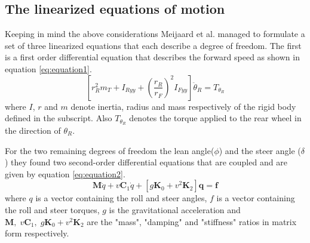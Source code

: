 \subsection{The linearized equations of motion} \label{subsec:EOM}
Keeping in mind the above considerations Meijaard et al.\cite{meijaard2007linearized} managed to formulate a set of three linearized equations that each describe a degree of freedom. The first is a first order differential equation that describes the forward speed as shown in equation \ref{eq:equation1}\cite{meijaard2007linearized}.
\begin{equation}
    \left[r_{R}^{2} m_{T}+I_{R y y}+\left(\frac{r_{R}}{r_{F}}\right)^{2} I_{F y y}\right] \ddot{\theta}_{R}=T_{\theta_{R}}
    \label{eq:equation1}
\end{equation}
where \ensuremath{I}, \ensuremath{r} and \ensuremath{m} denote inertia, radius and mass respectively of the rigid body defined in the subscript. Also \ensuremath{T_{\theta_{R}}} denotes the torque applied to the rear wheel in the direction of \ensuremath{\theta_{R}}.
\par
For the two remaining degrees of freedom the lean angle(\ensuremath{\phi}) and the steer angle (\ensuremath{\delta}) they found two second-order differential equations that are coupled and are given by equation \ref{eq:equation2}\cite{meijaard2007linearized}.
\begin{equation}
    \mathbf{M} \ddot{q}+v \mathbf{C}_{1} \dot{q}+\left[g \mathbf{K}_{0}+v^{2} \mathbf{K}_{2}\right] \mathbf{q}=\mathbf{f}
    \label{eq:equation2}
\end{equation}
where \ensuremath{q} is a vector containing the roll and steer angles, \ensuremath{f} is a vector containing the roll and steer torques, \ensuremath{g} is the gravitational acceleration and \ensuremath{\mathbf{M},\;v\mathbf{C}_{1},\;g \mathbf{K}_{0}+v^{2} \mathbf{K}_{2}} are the "mass", "damping" and "stiffness" ratios in matrix form respectively.

